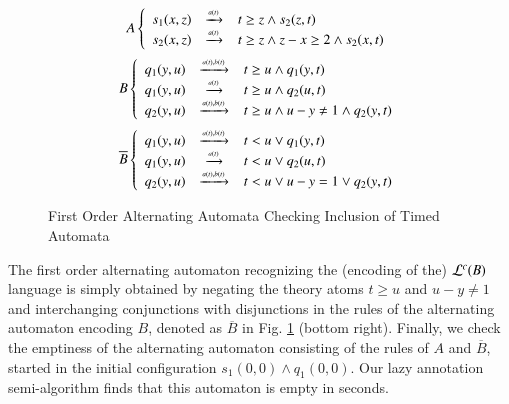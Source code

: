 \begin{figure}[htb]
\vspace*{-2\baselineskip}
\begin{center}
\begin{minipage}{5cm}

\end{minipage} 
\begin{minipage}{5cm}
\footnotesize{\[A \left\{\begin{array}{rcl}
s_1(x,z) & \xrightarrow{{\scriptscriptstyle a(t)}}_{{\scriptstyle }} & t \geq z \wedge s_2(z,t) \\
s_2(x,z) & \xrightarrow{{\scriptscriptstyle a(t)}}_{{\scriptstyle }} & t \geq z \wedge z-x \geq 2 \wedge s_2(x,t)
\end{array}\right.\] 
\[B \left\{\begin{array}{rcl}
q_1(y,u) & \xrightarrow{{\scriptscriptstyle a(t),b(t)}}_{{\scriptstyle }} & t \geq u \wedge q_1(y,t) \\
q_1(y,u) & \xrightarrow{{\scriptscriptstyle a(t)}}_{{\scriptstyle }} & t \geq u \wedge q_2(u,t) \\
q_2(y,u) & \xrightarrow{{\scriptscriptstyle a(t),b(t)}}_{{\scriptstyle }} & t \geq u \wedge u - y \neq 1 \wedge q_2(y,t)
\end{array}\right.\]
\[\overline{B}\left\{\begin{array}{rcl}
q_1(y,u) & \xrightarrow{{\scriptscriptstyle a(t),b(t)}}_{{\scriptstyle }} & t < u \vee q_1(y,t) \\
q_1(y,u) & \xrightarrow{{\scriptscriptstyle a(t)}}_{{\scriptstyle }} & t < u \vee q_2(u,t) \\
q_2(y,u) & \xrightarrow{{\scriptscriptstyle a(t),b(t)}}_{{\scriptstyle }} & t < u \vee u - y = 1 \vee q_2(y,t)
\end{array}\right.\]}
\end{minipage}
\end{center}
\vspace*{-\baselineskip}
\caption{First Order Alternating Automata Checking Inclusion of Timed Automata}
\label{fig:ta}
\vspace*{-\baselineskip}
\end{figure}

The first order alternating automaton recognizing the (encoding of
the) ${\mathcal L}^c({B})$ language is simply obtained by negating the theory
atoms $t \geq u$ and $u - y \neq 1$ and interchanging conjunctions
with disjunctions in the rules of the alternating automaton encoding
$B$, denoted as $\overline{B}$ in Fig. \ref{fig:ta} (bottom
right). Finally, we check the emptiness of the alternating automaton
consisting of the rules of $A$ and $\overline{B}$, started in the
initial configuration $s_1(0,0) \wedge q_1(0,0)$. Our lazy annotation
semi-algorithm finds that this automaton is empty in 
seconds. 

